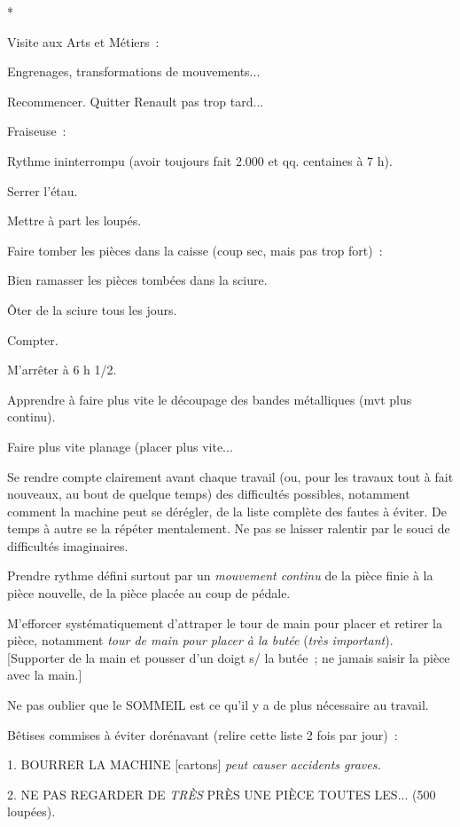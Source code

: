 \documentclass[french,twoside]{book} %
\begin{document}
\begin{center}
*\end{center}
\noindent Visite aux Arts et Métiers :\par
Engrenages, transformations de mouvements...\par
Recommencer. Quitter Renault pas trop tard...\par
Fraiseuse :\par
Rythme ininterrompu (avoir toujours fait 2.000 et qq. centaines à 7 h).\par
Serrer l'étau.\par
Mettre à part les loupés.\par
Faire tomber les pièces dans la caisse (coup sec, mais pas trop fort) :\par
Bien ramasser les pièces tombées dans la sciure.\par
Ôter de la sciure tous les jours.\par
Compter.\par
M'arrêter à 6 h 1/2.\par
Apprendre à faire plus vite le découpage des bandes métalliques (mvt plus continu).\par
Faire plus vite planage (placer plus vite...\par
Se rendre compte clairement avant chaque travail (ou, pour les travaux tout à fait nouveaux, au bout de quelque temps) des difficultés possibles, notamment comment la machine peut se dérégler, de la liste complète des fautes à éviter. De temps à autre se la répéter mentalement. Ne pas se laisser ralentir par le souci de difficultés imaginaires.\par
Prendre rythme défini surtout par un {\itshape mouvement continu} de la pièce finie à la pièce nouvelle, de la pièce placée au coup de pédale.\par
M'efforcer systématiquement d'attraper le tour de main pour placer et retirer la pièce, notamment {\itshape tour de main pour placer à la butée} ({\itshape très important}). [Supporter de la main et pousser d'un doigt s/ la butée ; ne jamais saisir la pièce avec la main.]\par
Ne pas oublier que le SOMMEIL est ce qu'il y a de plus nécessaire au travail.\par
Bêtises commises à éviter dorénavant (relire cette liste 2 fois par jour) :\par
1. BOURRER LA MACHINE [cartons] {\itshape peut causer accidents graves.}\par
2. NE PAS REGARDER DE {\itshape TRÈS} PRÈS UNE PIÈCE TOUTES LES... (500 loupées).\par
\end{document}
